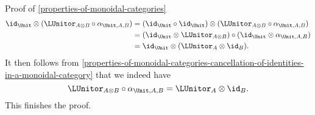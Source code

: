 \begin{Proof}{Proof of \cref{properties-of-monoidal-categories}}
    \begin{align*}
        \id_{\Unit}\otimes(\LUnitor_{A\otimes B}\circ\alpha_{\Unit,A,B}) &= (\id_{\Unit}\circ\id_{\Unit})\otimes(\LUnitor_{A\otimes B}\circ\alpha_{\Unit,A,B})\\
                                                                         &= (\id_{\Unit}\otimes\LUnitor_{A\otimes B})\circ(\id_{\Unit}\otimes\alpha_{\Unit,A,B})\\
                                                                         &= \id_{\Unit}\otimes(\LUnitor_{A}\otimes\id_{B}).
    \end{align*}
    It then follows from \cref{properties-of-monoidal-categories-cancellation-of-identities-in-a-monoidal-category} that we indeed have
    \[
        \LUnitor_{A\otimes B}\circ\alpha_{\Unit,A,B}
        =
        \LUnitor_{A}\otimes\id_{B}.
    \]
    This finishes the proof.


\end{Proof}
